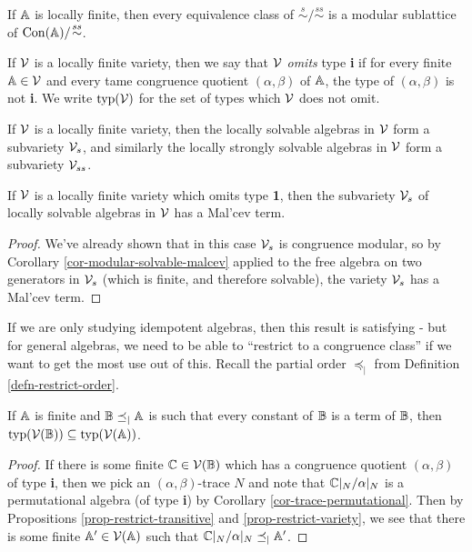 \begin{appendices}
\begin{cor} If $\mathbb{A}$ is locally finite, then every equivalence class of $\stackrel{s}{\sim}\!/\!\stackrel{ss}{\sim}$ is a modular sublattice of $\operatorname{Con}(\mathbb{A})/\!\stackrel{ss}{\sim}$.
\end{cor}

\begin{defn} If $\mathcal{V}$ is a locally finite variety, then we say that $\mathcal{V}$ \emph{omits} type \textbf{i} if for every finite $\mathbb{A} \in \mathcal{V}$ and every tame congruence quotient $(\alpha,\beta)$ of $\mathbb{A}$, the type of $(\alpha,\beta)$ is not \textbf{i}. We write $\operatorname{typ}(\mathcal{V})$ for the set of types which $\mathcal{V}$ does not omit.%
\end{defn}

\begin{prop} If $\mathcal{V}$ is a locally finite variety, then the locally solvable algebras in $\mathcal{V}$ form a subvariety $\mathcal{V}_s$, and similarly the locally strongly solvable algebras in $\mathcal{V}$ form a subvariety $\mathcal{V}_{ss}$.
\end{prop}

\begin{cor} If $\mathcal{V}$ is a locally finite variety which omits type \textbf{1}, then the subvariety $\mathcal{V}_s$ of locally solvable algebras in $\mathcal{V}$ has a Mal'cev term.
\end{cor}
\begin{proof} We've already shown that in this case $\mathcal{V}_s$ is congruence modular, so by Corollary \ref{cor-modular-solvable-malcev} applied to the free algebra on two generators in $\mathcal{V}_s$ (which is finite, and therefore solvable), the variety $\mathcal{V}_s$ has a Mal'cev term.
\end{proof}

If we are only studying idempotent algebras, then this result is satisfying - but for general algebras, we need to be able to ``restrict to a congruence class'' if we want to get the most use out of this. Recall the partial order $\preceq_|$ from Definition \ref{defn-restrict-order}.

\begin{prop} If $\mathbb{A}$ is finite and $\mathbb{B} \preceq_| \mathbb{A}$ is such that every constant of $\mathbb{B}$ is a term of $\mathbb{B}$, then $\operatorname{typ}(\mathcal{V}(\mathbb{B})) \subseteq \operatorname{typ}(\mathcal{V}(\mathbb{A}))$.
\end{prop}
\begin{proof} If there is some finite $\mathbb{C} \in \mathcal{V}(\mathbb{B})$ which has a congruence quotient $(\alpha, \beta)$ of type \textbf{i}, then we pick an $(\alpha,\beta)$-trace $N$ and note that $\mathbb{C}|_N / \alpha|_N$ is a permutational algebra (of type \textbf{i}) by Corollary \ref{cor-trace-permutational}. Then by Propositions \ref{prop-restrict-transitive} and \ref{prop-restrict-variety}, we see that there is some finite $\mathbb{A}' \in \mathcal{V}(\mathbb{A})$ such that $\mathbb{C}|_N/\alpha|_N \preceq_| \mathbb{A}'$.


\end{proof}
\end{appendices}
